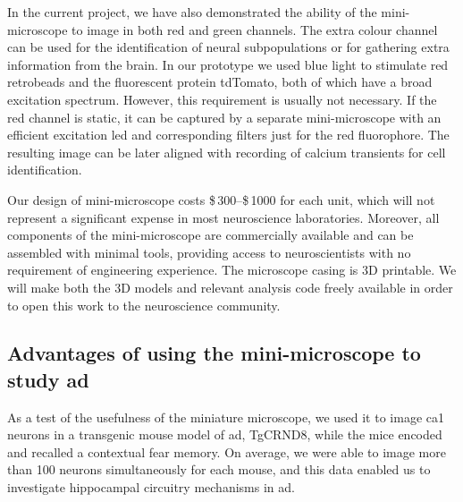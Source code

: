 In the current project, we have also demonstrated the ability of the mini-microscope to image in both red and green channels. The extra colour channel can be used for the identification of neural subpopulations or for gathering extra information from the brain. In our prototype we used blue light to stimulate red retrobeads and the fluorescent protein tdTomato, both of which have a broad excitation spectrum. However, this requirement is usually not necessary. If the red channel is static, it can be captured by a separate mini-microscope with an efficient excitation \gls{led} and corresponding filters just for the red fluorophore. The resulting image can be later aligned with recording of calcium transients for cell identification. 

Our design of mini-microscope costs \$\,300--\$\,1000 for each unit, which will not represent a significant expense in most neuroscience laboratories. Moreover, all components of the mini-microscope are commercially available and can be assembled with minimal tools, providing access to neuroscientists with no requirement of engineering experience. The microscope casing is 3D printable. We will make both the 3D models and relevant analysis code freely available in order to open this work to the neuroscience community.

\subsection{Advantages of using the mini-microscope to study \gls{ad}}

As a test of the usefulness of the miniature microscope, we used it to image \gls{ca1} neurons in a transgenic mouse model of \gls{ad}, TgCRND8, while the mice encoded and recalled a contextual fear memory. On average, we were able to image more than \num{100} neurons simultaneously for each mouse, and this data enabled us to investigate hippocampal circuitry mechanisms in \gls{ad}.

